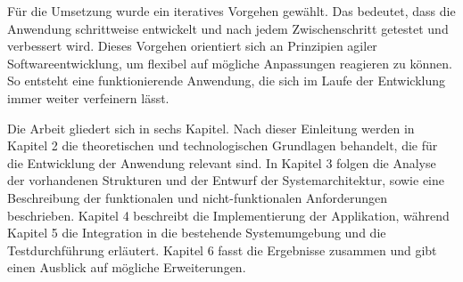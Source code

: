 Für die Umsetzung wurde ein iteratives Vorgehen gewählt.
Das bedeutet, dass die Anwendung schrittweise entwickelt und nach jedem Zwischenschritt getestet und verbessert wird.
Dieses Vorgehen orientiert sich an Prinzipien agiler Softwareentwicklung, um flexibel auf mögliche Anpassungen reagieren zu können.
So entsteht eine funktionierende Anwendung, die sich im Laufe der Entwicklung immer weiter verfeinern lässt.

Die Arbeit gliedert sich in sechs Kapitel.
Nach dieser Einleitung werden in Kapitel 2 die theoretischen und technologischen Grundlagen behandelt, die für die Entwicklung der Anwendung relevant sind.
In Kapitel 3 folgen die Analyse der vorhandenen Strukturen und der Entwurf der Systemarchitektur, sowie eine Beschreibung der funktionalen und nicht-funktionalen Anforderungen beschrieben.
Kapitel 4 beschreibt die Implementierung der Applikation, während Kapitel 5 die Integration in die bestehende Systemumgebung und die Testdurchführung erläutert.
Kapitel 6 fasst die Ergebnisse zusammen und gibt einen Ausblick auf mögliche Erweiterungen.
















